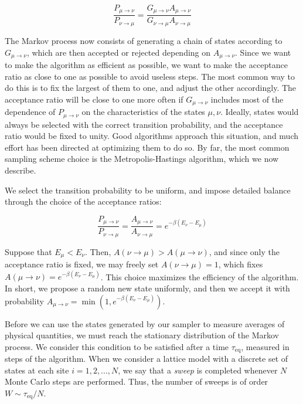 \begin{equation}
\frac{P_{\mu\rightarrow\nu}}{P_{\nu\rightarrow\mu}}= \frac{G_{ \mu\rightarrow\nu} A_{\mu\rightarrow\nu}}{G_{ \nu\rightarrow\mu} A_{\nu\rightarrow\mu}}
\end{equation}

The Markov process now consists of generating a chain of states according to $G_{ \mu\rightarrow\nu}$, which are then accepted or rejected depending on $A_{\mu\rightarrow\nu}$.
Since we want to make the algorithm as efficient as possible, we want to make the acceptance ratio as close to one as possible to avoid useless steps.	
The most common way to do this is to fix the largest of them to one, and adjust the other accordingly.
The acceptance ratio will be close to one more often if $G_{ \mu\rightarrow\nu}$ includes most of the dependence of $P_{\mu\rightarrow\nu}$ on the characteristics of the states $\mu, \nu$.
Ideally, states would always be selected with the correct transition probability, and the acceptance ratio would be fixed to unity.
Good algorithms approach this situation, and much effort has been directed at optimizing them to do so.
By far, the most common sampling scheme choice is the Metropolis-Hastings algorithm, which we now  describe.

We select the transition probability to be uniform, and impose detailed balance through the choice of the acceptance ratios:

\begin{equation}
\frac{ P_{\mu\rightarrow\nu }}{ P_{\nu\rightarrow\mu }} = \frac{ A_{\mu\rightarrow\nu }}{ A_{\nu\rightarrow\mu } } = e^{-\beta ( E_\nu - E_\mu )}
\end{equation}

Suppose that $E_\mu < E_\nu $.
Then, $A ( \nu \rightarrow \mu ) > A ( \mu \rightarrow \nu ) $, and since only the acceptance ratio is fixed, we may freely set $A ( \nu \rightarrow \mu ) = 1$, which fixes $A ( \mu \rightarrow \nu ) = e^{-\beta ( E_\nu - E_\mu ) }$.
This choice maximizes the efficiency of the algorithm.
In short, we propose a random new state uniformly, and then we accept it with probability $A_{\mu\rightarrow \nu} = \min (1,  e^{-\beta ( E_\nu - E_\mu )})$.

Before we can use the states generated by our sampler to measure averages of physical quantities, we must reach the stationary distribution of the Markov process.
We consider this condition to be satisfied after a time $\tau_{\text{eq}}$, measured in steps of the algorithm.
When we consider a lattice model with a discrete set of states at each site $i = 1, 2, ..., N$, we say that a \emph{sweep} is completed whenever $N$ Monte Carlo steps are performed.
Thus, the number of  sweeps is of order $W \sim \tau_{\text{eq}} / N$.

